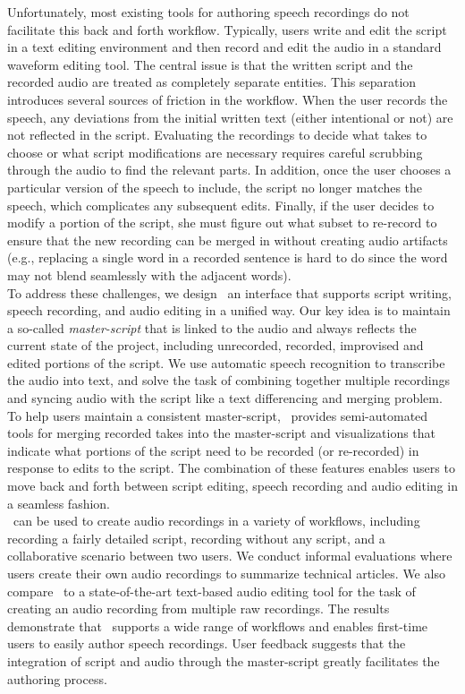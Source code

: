 Unfortunately, most existing tools for authoring speech recordings do not facilitate this back and forth workflow. Typically, users write and edit the script in a text editing environment and then record and edit the audio in a standard waveform editing tool. The central issue  is that the written script and the recorded audio are treated as completely separate entities.
%
This separation introduces several sources of friction in the workflow. When the user records the speech, any deviations from the initial written text (either intentional or not) are not reflected in the script. Evaluating the recordings to decide what takes to choose or what script modifications are necessary requires careful scrubbing through the audio to find the relevant parts. In addition, once the user chooses a particular version of the speech to include, the script no longer matches the speech, which complicates any subsequent edits. Finally, if the user decides to modify a portion of the script, she must figure out what subset to re-record to ensure that the new recording can be merged in without creating audio artifacts (e.g., replacing a single word in a recorded sentence is hard to do since the word may not blend seamlessly with the adjacent words).\\

To address these challenges, we design \voicescript\, an interface that supports script writing, speech recording, and audio editing in a unified way. Our key idea is to maintain a so-called \emph{master-script} that is linked to the audio and always reflects the current state of the project, including unrecorded, recorded, improvised and edited portions of the script. We use automatic speech recognition to transcribe the audio into text, and solve the task of combining together multiple recordings and syncing audio with the script like a text differencing and merging problem. To help users maintain a consistent master-script, \voicescript\ provides semi-automated tools for merging recorded takes into the master-script and visualizations that indicate what portions of the script need to be recorded (or re-recorded) in response to edits to the script. The combination of these features enables users to move back and forth between script editing, speech recording and audio editing in a seamless fashion.\\

\voicescript\ can be used to create audio recordings in a variety of workflows, including recording a fairly detailed script, recording without any script, and a collaborative scenario between two
users. We conduct informal evaluations where users create their own audio recordings to summarize technical articles. We also compare \voicescript\ to a state-of-the-art text-based audio editing tool for the task of creating an audio recording from multiple raw recordings. The results demonstrate that \voicescript\ supports a wide range of workflows and enables first-time users to  easily author speech recordings. User feedback suggests that the integration of script and audio through the master-script greatly facilitates the authoring process. 

